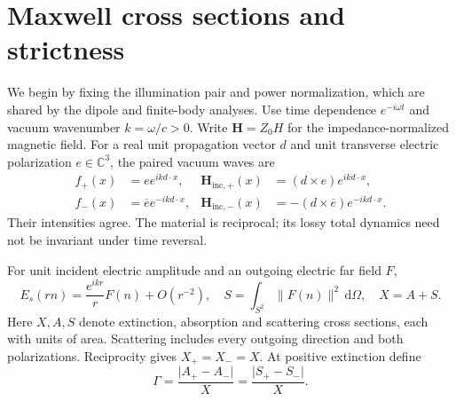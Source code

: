 \documentclass[11pt,a4paper]{article}
\theoremstyle{remark}
\newcommand{\norm}[1]{\lVert #1\rVert}
\newcommand{\abs}[1]{\lvert #1\rvert}
\newcommand{\dd}{\,\mathrm d}
\begin{document}
\section{Maxwell cross sections and strictness}\label{sec:model}
We begin by fixing the illumination pair and power normalization, which are shared by the dipole and finite-body analyses. Use time dependence $e^{-i\omega t}$ and vacuum wavenumber $k=\omega/c>0$. Write $\mathbf H=Z_0H$ for the impedance-normalized magnetic field. For a real unit propagation vector $d$ and unit transverse electric polarization $e\in\mathbb C^3$, the paired vacuum waves are
\begin{equation}\label{eq:incident}
 \begin{aligned}
 f_+(x)&=e e^{ikd\cdot x},&\mathbf H_{\mathrm{inc},+}(x)&=(d\times e)e^{ikd\cdot x},\\
 f_-(x)&=\overline e e^{-ikd\cdot x},&\mathbf H_{\mathrm{inc},-}(x)&=-(d\times\overline e)e^{-ikd\cdot x}.
 \end{aligned}
\end{equation}
Their intensities agree. The material is reciprocal; its lossy total dynamics need not be invariant under time reversal.

For unit incident electric amplitude and an outgoing electric far field $F$,
\begin{equation}\label{eq:cross-sections}
 E_s(rn)=\frac{e^{ikr}}rF(n)+O(r^{-2}),\quad
 S=\int_{S^2}\norm{F(n)}^2\dd\Omega,\quad X=A+S.
\end{equation}
Here $X,A,S$ denote extinction, absorption and scattering cross sections, each with units of area. Scattering includes every outgoing direction and both polarizations. Reciprocity gives $X_+=X_-=X$. At positive extinction define
\begin{equation}\label{eq:Gamma}
 \Gamma=\frac{\abs{A_+-A_-}}X=\frac{\abs{S_+-S_-}}X.
\end{equation}
\end{document}
